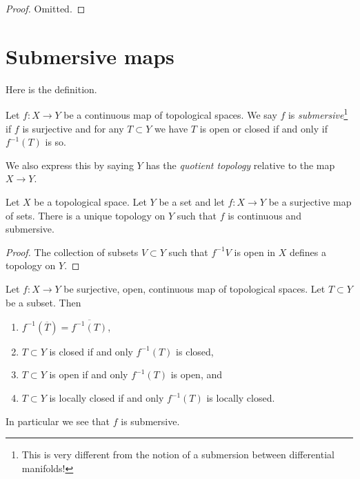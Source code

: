 \begin{proof}
Omitted.
\end{proof}





\section{Submersive maps}
\label{section-submersive}

\noindent
Here is the definition.

\begin{definition}
\label{definition-submersive}
Let $f : X \to Y$ be a continuous map of topological spaces.
We say $f$ is {\it submersive}\footnote{This is very different from
the notion of a submersion between differential manifolds!}
if $f$ is surjective and for any $T \subset Y$ we have $T$ is
open or closed if and only if $f^{-1}(T)$ is so.
\end{definition}

\noindent
We also express this by saying $Y$ has the
{\it quotient topology} relative to the map $X \to Y$.

\begin{lemma}
\label{lemma-quotient}
Let $X$ be a topological space. Let $Y$ be a set and let $f : X \to Y$
be a surjective map of sets. There is a unique topology on $Y$ such
that $f$ is continuous and submersive.
\end{lemma}

\begin{proof}
The collection of subsets $V \subset Y$ such that $f^{-1}V$
is open in $X$ defines a topology on $Y$.
\end{proof}

\begin{lemma}
\label{lemma-open-morphism-quotient-topology}
Let $f : X \to Y$ be surjective, open, continuous map of topological spaces.
Let $T \subset Y$ be a subset. Then
\begin{enumerate}
\item $f^{-1}(\overline{T}) = \overline{f^{-1}(T)}$,
\item $T \subset Y$ is closed if and only $f^{-1}(T)$ is closed,
\item $T \subset Y$ is open if and only $f^{-1}(T)$ is open, and
\item $T \subset Y$ is locally closed if and only $f^{-1}(T)$ is locally closed.
\end{enumerate}
In particular we see that $f$ is submersive.
\end{lemma}

